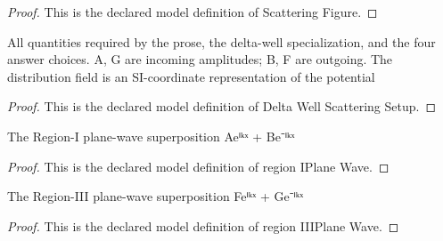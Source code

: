 \begin{proof}
  This is the declared model definition of Scattering Figure.
\end{proof}
\begin{definition}
  \label{def:physics:phyx-mini-0601:phyxminiproblems-problemphyxmini0601-deltawellscatteringsetup}
  All quantities required by the prose, the delta-well specialization, and the four answer choices. A, G are incoming amplitudes; B, F are outgoing. The distribution field is an SI-coordinate representation of the potential
\end{definition}
\begin{proof}
  This is the declared model definition of Delta Well Scattering Setup.
\end{proof}
\begin{definition}
  \label{def:physics:phyx-mini-0601:phyxminiproblems-problemphyxmini0601-regioniplanewave}
  The Region-I plane-wave superposition Aeⁱᵏˣ + Be⁻ⁱᵏˣ
\end{definition}
\begin{proof}
  This is the declared model definition of region IPlane Wave.
\end{proof}
\begin{definition}
  \label{def:physics:phyx-mini-0601:phyxminiproblems-problemphyxmini0601-regioniiiplanewave}
  The Region-III plane-wave superposition Feⁱᵏˣ + Ge⁻ⁱᵏˣ
\end{definition}
\begin{proof}
  This is the declared model definition of region IIIPlane Wave.
\end{proof}
